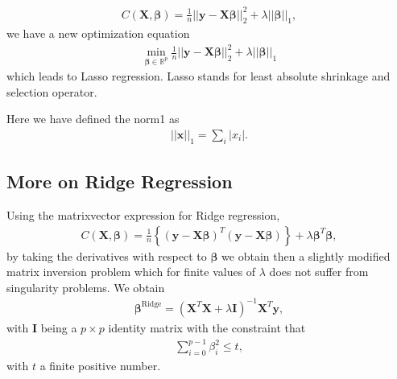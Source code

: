 \documentclass[letterpaper,10pt,english]{sphinxmanual}
\begin{document}
\begin{equation*}
\begin{split}
C(\boldsymbol{X},\boldsymbol{\beta})=\frac{1}{n}\vert\vert \boldsymbol{y}-\boldsymbol{X}\boldsymbol{\beta}\vert\vert_2^2+\lambda\vert\vert \boldsymbol{\beta}\vert\vert_1,
\end{split}
\end{equation*}
we have a new optimization equation
\begin{equation*}
\begin{split}
{\displaystyle \min_{\boldsymbol{\beta}\in
{\mathbb{R}}^{p}}}\frac{1}{n}\vert\vert \boldsymbol{y}-\boldsymbol{X}\boldsymbol{\beta}\vert\vert_2^2+\lambda\vert\vert \boldsymbol{\beta}\vert\vert_1
\end{split}
\end{equation*}
which leads to Lasso regression. Lasso stands for least absolute shrinkage and selection operator.

Here we have defined the norm\sphinxhyphen{}1 as
\begin{equation*}
\begin{split}
\vert\vert \boldsymbol{x}\vert\vert_1 = \sum_i \vert x_i\vert.
\end{split}
\end{equation*}

\subsection{More on Ridge Regression}
\label{\detokenize{chapter4:more-on-ridge-regression}}
Using the matrix\sphinxhyphen{}vector expression for Ridge regression,
\begin{equation*}
\begin{split}
C(\boldsymbol{X},\boldsymbol{\beta})=\frac{1}{n}\left\{(\boldsymbol{y}-\boldsymbol{X}\boldsymbol{\beta})^T(\boldsymbol{y}-\boldsymbol{X}\boldsymbol{\beta})\right\}+\lambda\boldsymbol{\beta}^T\boldsymbol{\beta},
\end{split}
\end{equation*}
by taking the derivatives with respect to \(\boldsymbol{\beta}\) we obtain then
a slightly modified matrix inversion problem which for finite values
of \(\lambda\) does not suffer from singularity problems. We obtain
\begin{equation*}
\begin{split}
\boldsymbol{\beta}^{\mathrm{Ridge}} = \left(\boldsymbol{X}^T\boldsymbol{X}+\lambda\boldsymbol{I}\right)^{-1}\boldsymbol{X}^T\boldsymbol{y},
\end{split}
\end{equation*}
with \(\boldsymbol{I}\) being a \(p\times p\) identity matrix with the constraint that
\begin{equation*}
\begin{split}
\sum_{i=0}^{p-1} \beta_i^2 \leq t,
\end{split}
\end{equation*}
with \(t\) a finite positive number.
\end{document}
